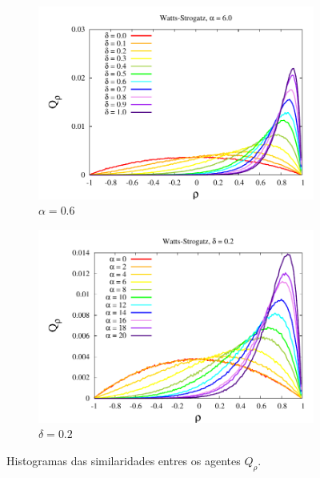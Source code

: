 \begin{figure}
    \centering
    \begin{subfigure}[]{0.7\textwidth}
        \centering
        \includegraphics[width =\textwidth]{Figures/HistoDeltaBeta6}
        \caption{$\alpha = 0.6$}
        \label{fig:Histo-vd}
    \end{subfigure}
    \begin{subfigure}[]{0.7\textwidth}
        \centering
        \includegraphics[width =\textwidth]{Figures/HistoBetaDelta02}
        \caption{$\delta = 0.2$}
        \label{fig:Histo-va}
    \end{subfigure}
    \newline
    \caption{Histogramas das similaridades entres os agentes $Q_\rho$.}
    \label{fig:hist1}
\end{figure}

